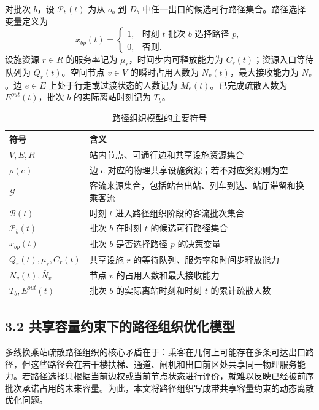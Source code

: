 \documentclass[UTF8,a4paper,12pt]{ctexart}
\begin{document}
对批次 \(b\)，设 \(\mathcal P_b(t)\) 为从 \(o_b\) 到 \(D_b\) 中任一出口的候选可行路径集合。路径选择变量定义为
\[
x_{bp}(t)=
\begin{cases}
1, & \text{时刻 }t\text{ 批次 }b\text{ 选择路径 }p,\\
0, & \text{否则}.
\end{cases}
\]
设施资源 \(r\in R\) 的服务率记为 \(\mu_r\)，时间步内可释放能力为 \(C_r(t)\)；资源入口等待队列为 \(Q_r(t)\)。空间节点 \(v\in V\) 的瞬时占用人数为 \(N_v(t)\)，最大接收能力为 \(\bar N_v\)。边 \(e\in E\) 上处于行走或过渡状态的人数记为 \(M_e(t)\)。已完成疏散人数为 \(E^{out}(t)\)，批次 \(b\) 的实际离站时刻记为 \(T_b\)。

\begin{table}[htbp]
\centering
\caption{路径组织模型的主要符号}
\small
\begin{tabular}{p{}p{}}
\toprule
符号 & 含义 \\
\midrule
\(V,E,R\) & 站内节点、可通行边和共享设施资源集合 \\
\(\rho(e)\) & 边 \(e\) 对应的物理共享设施资源；若不对应资源则为空 \\
\(\mathcal G\) & 客流来源集合，包括站台出站、列车到达、站厅滞留和换乘客流 \\
\(\mathcal B(t)\) & 时刻 \(t\) 进入路径组织阶段的客流批次集合 \\
\(\mathcal P_b(t)\) & 批次 \(b\) 在时刻 \(t\) 的候选可行路径集合 \\
\(x_{bp}(t)\) & 批次 \(b\) 是否选择路径 \(p\) 的决策变量 \\
\(Q_r(t),\mu_r,C_r(t)\) & 共享设施 \(r\) 的等待队列、服务率和时间步释放能力 \\
\(N_v(t),\bar N_v\) & 节点 \(v\) 的占用人数和最大接收能力 \\
\(T_b,E^{out}(t)\) & 批次 \(b\) 的实际离站时刻和时刻 \(t\) 的累计疏散人数 \\
\bottomrule
\end{tabular}
\end{table}

\subsection{3.2 共享容量约束下的路径组织优化模型}

多线换乘站疏散路径组织的核心矛盾在于：乘客在几何上可能存在多条可达出口路径，但这些路径会在若干楼扶梯、通道、闸机和出口前区处共享同一物理服务能力。若路径选择只根据当前边权或当前节点状态进行评价，就难以反映已经被前序批次承诺占用的未来容量。为此，本文将路径组织写成带共享容量约束的动态离散优化问题。
\end{document}
